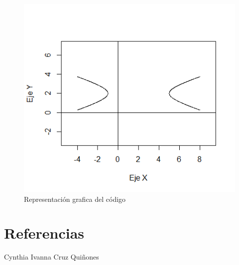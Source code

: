 \documentclass[12pt,a4paper]{article} %
\begin{document}
\begin{figure}
\centering
\includegraphics[scale=0.8]{Hiperbola2}
\caption{Representación grafica del código}
\label{fig:Hiperbola2}
\end{figure}


\newpage

\section{Referencias}

\citep{repositorio}Cynthia Ivanna Cruz Quiñones



\end{document}
